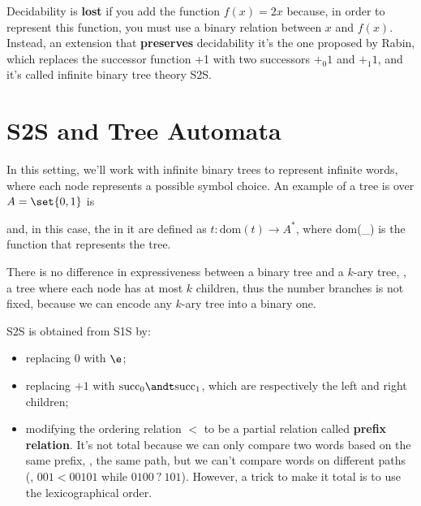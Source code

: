 \documentclass[oneside]{academica}
\begin{document}
Decidability is \textbf{lost} if you add the function $f(x) = 2x$ because, in order to represent this function, you must use a binary relation between $x$ and $f(x)$.
Instead, an extension that \textbf{preserves} decidability it's the one proposed by Rabin, which replaces the successor function +1 with two successors $+_0 1$ and $+_1 1$, and it's called infinite binary tree theory S2S.

\begin{center}
  
\end{center}

\section{S2S and Tree Automata}

In this setting, we'll work with infinite binary trees to represent infinite words, where each node represents a possible symbol choice.
An example of a tree is over $A=\set{0,1}$ is
\begin{center}
  
\end{center}
and, in this case, the \wwords in it are defined as $t: \text{dom}(t) \to A^*$, where dom(\_) is the function that represents the tree.

There is no difference in expressiveness between a binary tree and a $k$-ary tree, \ie, a tree where each node has at most $k$ children, thus the number branches is not fixed, because we can encode any $k$-ary tree into a binary one.

\bigskip
S2S is obtained from S1S by:
\begin{itemize}
  \item replacing 0 with $\e$;
  \item replacing $+1$ with $\succ_0 \andt \succ_1$, which are respectively the left and right children;
  \item modifying the ordering relation $<$ to be a partial relation called \textbf{prefix relation}. It's not total because we can only compare two words based on the same prefix, \ie, the same path, but we can't compare words on different paths (\eg, $001 < 00101$ while $0100\ ?\ 101$). However, a trick to make it total is to use the lexicographical order.
\end{itemize}
\end{document}
